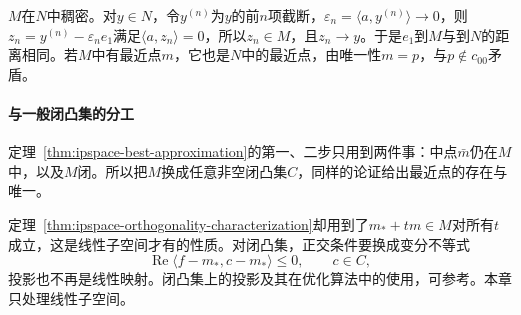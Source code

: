 $M$在$N$中稠密。对$y\in N$，令$y^{(n)}$为$y$的前$n$项截断，$\varepsilon_n=\langle a,y^{(n)}\rangle\to0$，则$z_n=y^{(n)}-\varepsilon_ne_1$满足$\langle a,z_n\rangle=0$，所以$z_n\in M$，且$z_n\to y$。于是$e_1$到$M$与到$N$的距离相同。若$M$中有最近点$m$，它也是$N$中的最近点，由唯一性$m=p$，与$p\notin c_{00}$矛盾。

\paragraph{与一般闭凸集的分工}
定理~\ref{thm:ipspace-best-approximation}的第一、二步只用到两件事：中点$\bar m$仍在$M$中，以及$M$闭。所以把$M$换成任意非空闭凸集$C$，同样的论证给出最近点的存在与唯一。

定理~\ref{thm:ipspace-orthogonality-characterization}却用到了$m_*+tm\in M$对所有$t$成立，这是线性子空间才有的性质。对闭凸集，正交条件要换成变分不等式
\[
 \operatorname{Re}\langle f-m_*,c-m_*\rangle\leq0,\qquad c\in C ,
\]
投影也不再是线性映射。闭凸集上的投影及其在优化算法中的使用，可参考。本章只处理线性子空间。
